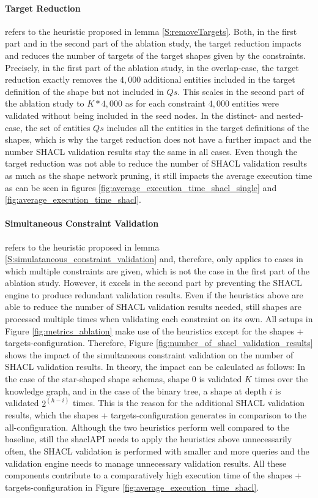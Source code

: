\paragraph{Target Reduction} refers to the heuristic proposed in lemma \ref{S:removeTargets}. Both, in the first part and in the second part of the ablation study, the target reduction impacts and reduces the number of targets of the target shapes given by the constraints. Precisely, in the first part of the ablation study, in the \glqq overlap\grqq{}-case, the target reduction exactly removes the $4,000$ additional entities included in the target definition of the shape but not included in $Qs$. This scales in the second part of the ablation study to $K * 4,000$ as for each constraint $4,000$ entities were validated without being included in the seed nodes. In the \glqq distinct\grqq{}- and \glqq nested\grqq{}-case, the set of entities $Qs$ includes all the entities in the target definitions of the shapes, which is why the target reduction does not have a further impact and the number SHACL validation results stay the same in all cases. Even though the target reduction was not able to reduce the number of SHACL validation results as much as the shape network pruning, it still impacts the average execution time as can be seen in figures \ref{fig:average_execution_time_shacl_single} and \ref{fig:average_execution_time_shacl}.

\paragraph{Simultaneous Constraint Validation} refers to the heuristic proposed in lemma \ref{S:simulataneous_constraint_validation} and, therefore, only applies to cases in which multiple constraints are given, which is not the case in the first part of the ablation study. However, it excels in the second part by preventing the SHACL engine to produce redundant validation results. Even if the heuristics above are able to reduce the number of SHACL validation results needed, still shapes are processed multiple times when validating each constraint on its own. All setups in Figure \ref{fig:metrics_ablation} make use of the heuristics except for the \glqq shapes + targets\grqq{}-configuration. Therefore, Figure \ref{fig:number_of_shacl_validation_results} shows the impact of the simultaneous constraint validation on the number of SHACL validation results. In theory, the impact can be calculated as follows: In the case of the star-shaped shape schemas, shape $0$ is validated $K$ times over the knowledge graph, and in the case of the binary tree, a shape at depth $i$ is validated $2^{(h-i)}$ times. This is the reason for the additional SHACL validation results, which the \glqq shapes + targets\grqq{}-configuration generates in comparison to the \glqq all\grqq{}-configuration.
Although the two heuristics perform well compared to the baseline, still the shaclAPI needs to apply the heuristics above unnecessarily often, the SHACL validation is performed with smaller and more queries and the validation engine needs to manage unnecessary validation results. All these components contribute to a comparatively high execution time of the \glqq shapes + targets\grqq{}-configuration in Figure \ref{fig:average_execution_time_shacl}.


